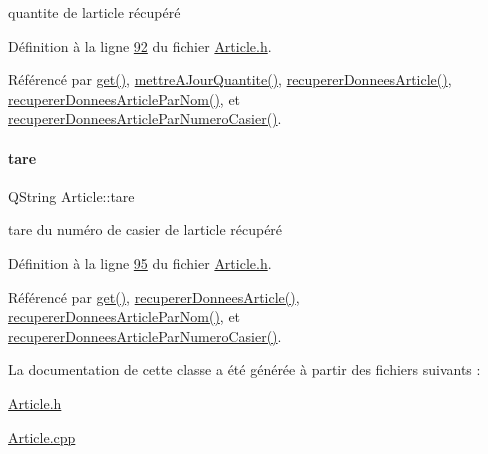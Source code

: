 quantite de l\textquotesingle{}article récupéré 



Définition à la ligne \hyperlink{_article_8h_source_l00092}{92} du fichier \hyperlink{_article_8h_source}{Article.\+h}.



Référencé par \hyperlink{_article_8cpp_source_l00266}{get()}, \hyperlink{_article_8cpp_source_l00329}{mettre\+A\+Jour\+Quantite()}, \hyperlink{_article_8cpp_source_l00050}{recuperer\+Donnees\+Article()}, \hyperlink{_article_8cpp_source_l00103}{recuperer\+Donnees\+Article\+Par\+Nom()}, et \hyperlink{_article_8cpp_source_l00156}{recuperer\+Donnees\+Article\+Par\+Numero\+Casier()}.

\mbox{\label{class_article_abacf2d29d4b2e3e7b49256bc48d5fe64}} 
\paragraph{\texorpdfstring{tare}{tare}}
{\footnotesize\ttfamily Q\+String Article\+::tare\hspace{0.3cm}{\ttfamily [private]}}



tare du numéro de casier de l\textquotesingle{}article récupéré 



Définition à la ligne \hyperlink{_article_8h_source_l00095}{95} du fichier \hyperlink{_article_8h_source}{Article.\+h}.



Référencé par \hyperlink{_article_8cpp_source_l00266}{get()}, \hyperlink{_article_8cpp_source_l00050}{recuperer\+Donnees\+Article()}, \hyperlink{_article_8cpp_source_l00103}{recuperer\+Donnees\+Article\+Par\+Nom()}, et \hyperlink{_article_8cpp_source_l00156}{recuperer\+Donnees\+Article\+Par\+Numero\+Casier()}.



La documentation de cette classe a été générée à partir des fichiers suivants \+:\begin{DoxyCompactItemize}
\item 
\hyperlink{_article_8h}{Article.\+h}\item 
\hyperlink{_article_8cpp}{Article.\+cpp}\end{DoxyCompactItemize}
